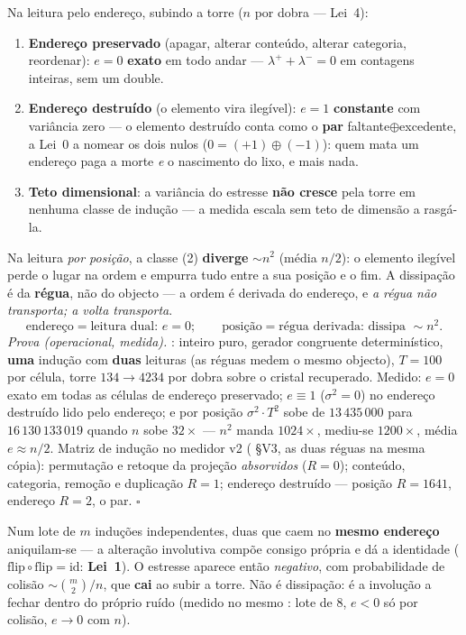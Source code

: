 \documentclass[livro.tex]{subfiles}
\begin{document}
\begin{teorema}\label{thm:absorcao}
Na leitura pelo endereço, subindo a torre ($n$ por dobra --- Lei~4):
\begin{enumerate}
\item \textbf{Endereço preservado} (apagar, alterar conteúdo, alterar
categoria, reordenar): $e=0$ \textbf{exato} em todo andar ---
$\lambda^{+}+\lambda^{-}=0$ em contagens inteiras, sem um double.
\item \textbf{Endereço destruído} (o elemento vira ilegível): $e=1$
\textbf{constante} com variância zero --- o elemento destruído conta como
o \textbf{par} faltante$\oplus$excedente, a Lei~0 a nomear os dois nulos
($0=(+1)\oplus(-1)$): quem mata um endereço paga a morte \emph{e} o
nascimento do lixo, e mais nada.
\item \textbf{Teto dimensional}: a variância do estresse \textbf{não
cresce} pela torre em nenhuma classe de indução --- a medida escala
sem teto de dimensão a rasgá-la.
\end{enumerate}
Na leitura \emph{por posição}, a classe (2) \textbf{diverge}
$\sim n^{2}$ (média $n/2$): o elemento ilegível perde o lugar na ordem e
empurra tudo entre a sua posição e o fim. A dissipação é da
\textbf{régua}, não do objecto --- a ordem é derivada do endereço, e
\emph{a régua não transporta; a volta transporta}.
\[
\boxed{
\text{endereço}=\text{leitura dual: }e=0;\qquad
\text{posição}=\text{régua derivada: dissipa }\sim n^{2}.
}
\]
\emph{Prova (operacional, medida).} :
inteiro puro, gerador congruente determinístico, \textbf{uma} indução
com \textbf{duas} leituras (as réguas medem o mesmo objecto), $T=100$ por
célula, torre $134\to4234$ por dobra sobre o cristal recuperado. Medido:
$e=0$ exato em todas as células de endereço preservado; $e\equiv1$
($\sigma^{2}=0$) no endereço destruído lido pelo endereço; e por posição
$\sigma^{2}\cdot T^{2}$ sobe de $13\,435\,000$ para $16\,130\,133\,019$
quando $n$ sobe $32\times$ --- $n^{2}$ manda $1024\times$, mediu-se
$1200\times$, média $e\approx n/2$. Matriz de indução no medidor v2
( \S V3, as duas réguas na mesma cópia):
permutação e retoque da projeção \emph{absorvidos} ($R=0$); conteúdo,
categoria, remoção e duplicação $R=1$; endereço destruído --- posição
$R=1641$, endereço $R=2$, o par. $\square$
\end{teorema}

\begin{proposicao}\label{prop:involucao-ruido}
Num lote de $m$ induções independentes, duas que caem no
\textbf{mesmo endereço} aniquilam-se --- a alteração involutiva compõe
consigo própria e dá a identidade ($\mathrm{flip}\circ\mathrm{flip}=
\mathrm{id}$: \textbf{Lei~1}). O estresse aparece então \emph{negativo},
com probabilidade de colisão $\sim\binom{m}{2}/n$, que \textbf{cai} ao
subir a torre. Não é dissipação: é a involução a fechar dentro do próprio
ruído (medido no mesmo : lote de $8$,
$e<0$ só por colisão, $e\to0$ com $n$).
\end{proposicao}
\end{document}
